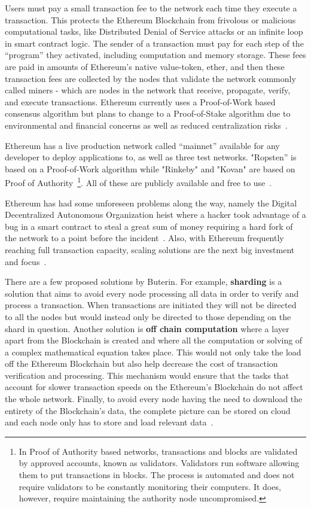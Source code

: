 Users must pay a small transaction fee to the network each time they execute a
transaction. This protects the Ethereum Blockchain from frivolous or malicious
computational tasks, like Distributed Denial of Service attacks or an infinite
loop in smart contract logic. The sender of a transaction must pay for each
step of the “program” they activated, including computation and memory storage.
These fees are paid in amounts of Ethereum’s native value-token, ether, and
then these transaction fees are collected by the nodes that validate the
network commonly called miners - which are nodes in the network that receive,
propagate, verify, and execute transactions. Ethereum currently uses a
Proof-of-Work based consensus algorithm but plans to change to a Proof-of-Stake
algorithm due to environmental and financial concerns as well as reduced
centralization risks~\cite{EthereumDocs2018,EthereumPOSFAQ2018}.

Ethereum has a live production network called “mainnet” available for any
developer to deploy applications to, as well as three test networks. "Ropsten”
is based on a Proof-of-Work algorithm while "Rinkeby" and "Kovan" are based on
Proof of Authority~\footnote{In Proof of Authority based networks, transactions
and blocks are validated by approved accounts, known as validators. Validators
run software allowing them to put transactions in blocks. The process is
automated and does not require validators to be constantly monitoring their
computers. It does, however, require maintaining the authority node
uncompromised.}. All of these are publicly available and free to
use~\cite{Barclay2017,EthereumTestNetworks2018}.

Ethereum has had some unforeseen problems along the way, namely the Digital
Decentralized Autonomous Organization heist where a hacker took advantage of a
bug in a smart contract to steal a great sum of money requiring a hard fork of
the network to a point before the incident~\cite{Leising2017}. Also, with
Ethereum frequently reaching full transaction capacity, scaling solutions are
the next big investment and focus~\cite{ethereumScalability2018}.

There are a few proposed solutions by Buterin. For example, \textbf{sharding}
is a solution that aims to avoid every node processing all data in order to
verify and process a transaction. When transactions are initiated they will not
be directed to all the nodes but would instead only be directed to those
depending on the shard in question.  Another solution is \textbf{off chain
computation} where a layer apart from the Blockchain is created and where all
the computation or solving of a complex mathematical equation takes place. This
would not only take the load off the Ethereum Blockchain but also help decrease
the cost of transaction verification and processing. This mechanism would
ensure that the tasks that account for slower transaction speeds on the
Ethereum’s Blockchain do not affect the whole network. Finally, to avoid every
node having the need to download the entirety of the Blockchain's data, the
complete picture can be stored on cloud and each node only has to store and
load relevant data~\cite{ethereumBlogScalability2018}.

